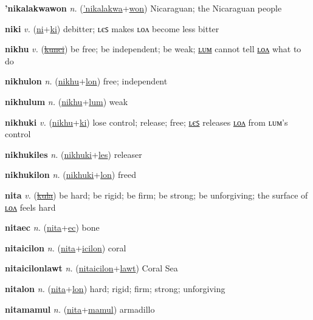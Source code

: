 \textbf{\hypertarget{'nikalakwawon}{'nikalakwawon}} \textit{n.} (\hyperlink{'nikalakwa}{'nikalakwa}+\allowbreak \hyperlink{won}{won})
Nicaraguan; the Nicaraguan people

\textbf{\hypertarget{niki}{niki}} \textit{v.} (\hyperlink{ni}{ni}+\allowbreak \hyperlink{ki}{ki})
debitter; ʟєꜱ makes ʟᴏᴧ become less bitter

\textbf{\hypertarget{nikhu}{nikhu}} \textit{v.} (\hyperlink{kunci}{\sout{kunci}})
be free; be independent; be weak; \hyperlink{nikhulum}{ʟᴜᴍ} cannot tell \hyperlink{nikhulon}{ʟᴏᴧ} what to do

\textbf{\hypertarget{nikhulon}{nikhulon}} \textit{n.} (\hyperlink{nikhu}{nikhu}+\allowbreak \hyperlink{lon}{lon})
free; independent

\textbf{\hypertarget{nikhulum}{nikhulum}} \textit{n.} (\hyperlink{nikhu}{nikhu}+\allowbreak \hyperlink{lum}{lum})
weak

\textbf{\hypertarget{nikhuki}{nikhuki}} \textit{v.} (\hyperlink{nikhu}{nikhu}+\allowbreak \hyperlink{ki}{ki})
lose control; release; free; \hyperlink{nikhukiles}{ʟєꜱ} releases \hyperlink{nikhukilon}{ʟᴏᴧ} from ʟᴜᴍ’s control

\textbf{\hypertarget{nikhukiles}{nikhukiles}} \textit{n.} (\hyperlink{nikhuki}{nikhuki}+\allowbreak \hyperlink{les}{les})
releaser

\textbf{\hypertarget{nikhukilon}{nikhukilon}} \textit{n.} (\hyperlink{nikhuki}{nikhuki}+\allowbreak \hyperlink{lon}{lon})
freed

\textbf{\hypertarget{nita}{nita}} \textit{v.} (\hyperlink{kula}{\sout{kula}})
be hard; be rigid; be firm; be strong; be unforgiving; the surface of \hyperlink{nitalon}{ʟᴏᴧ} feels hard

\textbf{\hypertarget{nitaec}{nitaec}} \textit{n.} (\hyperlink{nita}{nita}+\allowbreak \hyperlink{ec}{ec})
bone

\textbf{\hypertarget{nitaicilon}{nitaicilon}} \textit{n.} (\hyperlink{nita}{nita}+\allowbreak \hyperlink{icilon}{icilon})
coral

\textbf{\hypertarget{nitaicilonlawt}{nitaicilonlawt}} \textit{n.} (\hyperlink{nitaicilon}{nitaicilon}+\allowbreak \hyperlink{lawt}{lawt})
Coral Sea

\textbf{\hypertarget{nitalon}{nitalon}} \textit{n.} (\hyperlink{nita}{nita}+\allowbreak \hyperlink{lon}{lon})
hard; rigid; firm; strong; unforgiving

\textbf{\hypertarget{nitamamul}{nitamamul}} \textit{n.} (\hyperlink{nita}{nita}+\allowbreak \hyperlink{mamul}{mamul})
armadillo

